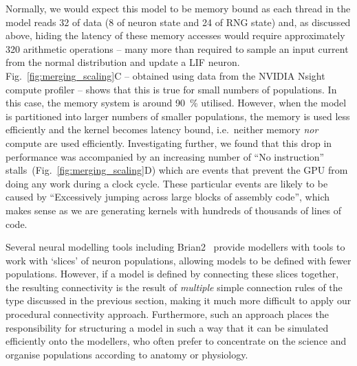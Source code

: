 \documentclass[9pt,a4paper]{amsart}
\newcommand{\todo}[1]{\textbf{\textsc{\textcolor{red}{(TODO: #1)}}}}
\begin{document}
Normally, we would expect this model to be memory bound as each thread in the model reads \SI{32}{\byte} of data (\SI{8}{\byte} of neuron state and \SI{24}{\byte} of RNG state) and, as discussed above, hiding the latency of these memory accesses would require approximately 320 arithmetic operations -- many more than required to sample an input current from the normal distribution and update a LIF neuron.
Fig.~\ref{fig:merging_scaling}C -- obtained using data from the NVIDIA Nsight compute profiler -- shows that this is true for small numbers of populations.
In this case, the memory system is around \SI{90}{\percent} utilised.
However, when the model is partitioned into larger numbers of smaller populations, the memory is used less efficiently and the kernel becomes latency bound, i.e.~neither memory \emph{nor} compute are used efficiently.
Investigating further, we found that this drop in performance was accompanied by an increasing number of ``No instruction'' stalls~(Fig.~\ref{fig:merging_scaling}D) which are events that prevent the GPU from doing any work during a clock cycle.
These particular events are likely to be caused by ``Excessively jumping across large blocks of assembly code'', which makes sense as we are generating kernels with hundreds of thousands of lines of code.

Several neural modelling tools including Brian2~\citep{Stimberg2019} provide modellers with tools to work with `slices' of neuron populations, allowing models to be defined with fewer populations.
However, if a model is defined by connecting these slices together, the resulting connectivity is the result of \emph{multiple} simple connection rules of the type discussed in the previous section, making it much more difficult to apply our procedural connectivity approach.
Furthermore, such an approach places the responsibility for structuring a model in such a way that it can be simulated efficiently onto the modellers, who often prefer to concentrate on the science and organise populations according to anatomy or physiology.
\end{document}
